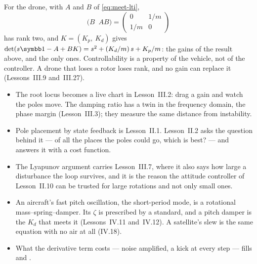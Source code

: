 For the drone, with $A$ and $B$ of \cref{eq:meet-lti},
\begin{equation*}
  \big(B \;\; AB\big) = \begin{pmatrix} 0 & 1/m \\ 1/m & 0 \end{pmatrix}
\end{equation*}
has rank two, and $K = (K_p,\ K_d)$ gives $\det(s\Id - A + BK) = s^2 + (K_d/m)\,s + K_p/m$: the gains of the result above, and the only ones. Controllability is a property of the vehicle, not of the controller. A drone that loses a rotor loses rank, and no gain can replace it (Lessons~III.9 and~III.27).

\begin{lookahead}
\begin{itemize}[leftmargin=1.2em]
  \item The root locus becomes a live chart in Lesson~III.2: drag a gain and watch the poles move. The damping ratio has a twin in the frequency domain, the phase margin (Lesson~III.3); they measure the same distance from instability.
  \item Pole placement by state feedback is Lesson~II.1. Lesson~II.2 asks the question behind it — of all the places the poles could go, which is best? — and answers it with a cost function.
  \item The Lyapunov argument carries Lesson~III.7, where it also says how large a disturbance the loop survives, and it is the reason the attitude controller of Lesson~II.10 can be trusted for large rotations and not only small ones.
  \item An aircraft's fast pitch oscillation, the short-period mode, is a rotational mass–spring–damper. Its $\zeta$ is prescribed by a standard, and a pitch damper is the $K_d$ that meets it (Lessons~IV.11 and~IV.12). A satellite's slew is the same equation with no air at all (IV.18).
  \item What the derivative term costs — noise amplified, a kick at every step — fills  and .
\end{itemize}
\end{lookahead}

